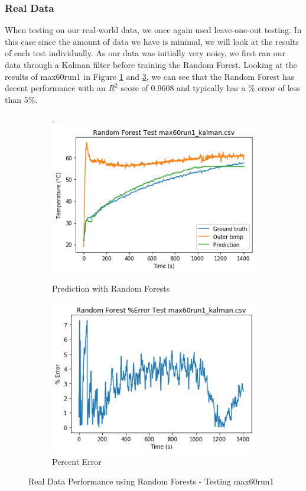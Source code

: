 \subsubsection{Real Data}
When testing on our real-world data, we once again used leave-one-out testing. In this case since the amount of data we have is minimal, we will look at the results of each test individually. As our data was initially very noisy, we first ran our data through a Kalman filter before training the Random Forest. Looking at the results of max60run1 in Figure \ref{rf601} and \ref{rf601err}, we can see that the Random Forest has decent performance with an $R^2$ score of 0.9608 and typically has a \% error of less than 5\%.

\begin{figure}[ht]
    \begin{subfigure}{.5\linewidth}.
        \centering
    	\includegraphics[width=\linewidth]{other/RF_prediction_real.png}
        \caption{Prediction with Random Forests}
        \label{rf601}
    \end{subfigure}
    \begin{subfigure}{.5\linewidth}
    	\centering
    	\includegraphics[width=\linewidth]{other/RF_error_real.png}
        \caption{Percent Error}
        \label{rf601err}
    \end{subfigure}
    \caption{Real Data Performance using Random Forests - Testing max60run1}
\end{figure}

